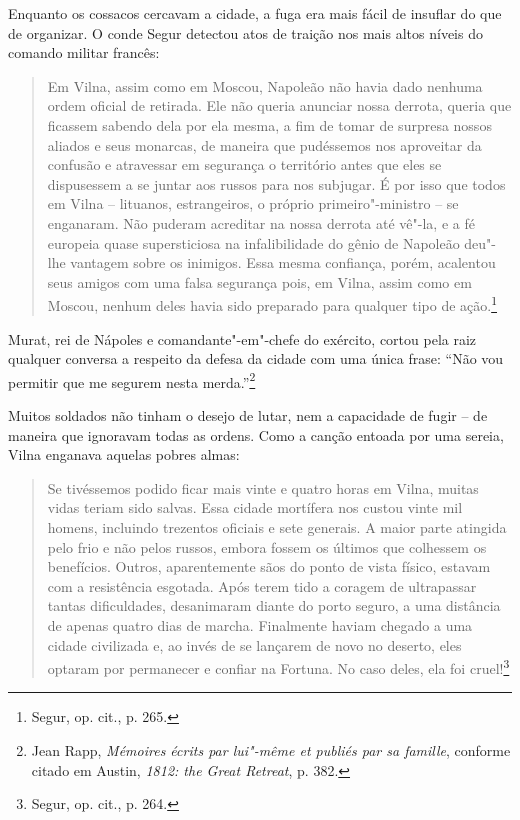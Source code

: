 Enquanto os cossacos cercavam a cidade, a fuga era mais fácil de
insuflar do que de organizar. O conde Segur detectou atos de traição nos
mais altos níveis do comando militar francês:

\begin{quote}
Em Vilna, assim como em Moscou, Napoleão não havia dado nenhuma ordem
oficial de retirada. Ele não queria anunciar nossa derrota, queria que
ficassem sabendo dela por ela mesma, a fim de tomar de surpresa nossos
aliados e seus monarcas, de maneira que pudéssemos nos aproveitar da
confusão e atravessar em segurança o território antes que eles se
dispusessem a se juntar aos russos para nos subjugar. É por isso que
todos em Vilna -- lituanos, estrangeiros, o próprio primeiro"-ministro --
se enganaram. Não puderam acreditar na nossa derrota até vê"-la, e a fé
europeia quase supersticiosa na infalibilidade do gênio de Napoleão
deu"-lhe vantagem sobre os inimigos. Essa mesma confiança, porém,
acalentou seus amigos com uma falsa segurança pois, em Vilna, assim como
em Moscou, nenhum deles havia sido preparado para qualquer tipo de
ação.\footnote{Segur, op. cit., p. 265.}
\end{quote}

Murat, rei de Nápoles e comandante"-em"-chefe do exército, cortou pela
raiz qualquer conversa a respeito da defesa da cidade com uma única
frase: ``Não vou permitir que me segurem nesta merda.''\footnote{Jean Rapp, \textit{Mémoires écrits par lui"-même et publiés par sa famille}, conforme citado em Austin, \textit{1812: the Great Retreat}, p. 382.}

Muitos soldados não tinham o desejo de lutar, nem a capacidade de fugir
-- de maneira que ignoravam todas as ordens. Como a canção entoada por
uma sereia, Vilna enganava aquelas pobres almas:

\begin{quote}
Se tivéssemos podido ficar mais vinte e quatro horas em Vilna, muitas
vidas teriam sido salvas. Essa cidade mortífera nos custou vinte mil
homens, incluindo trezentos oficiais e sete generais. A maior parte
atingida pelo frio e não pelos russos, embora fossem os últimos que
colhessem os benefícios. Outros, aparentemente sãos do ponto de vista
físico, estavam com a resistência esgotada. Após terem tido a coragem de
ultrapassar tantas dificuldades, desanimaram diante do porto seguro, a
uma distância de apenas quatro dias de marcha. Finalmente haviam chegado
a uma cidade civilizada e, ao invés de se lançarem de novo no deserto,
eles optaram por permanecer e confiar na Fortuna. No caso deles, ela foi
cruel!\footnote{Segur, op. cit., p. 264.}
\end{quote}

